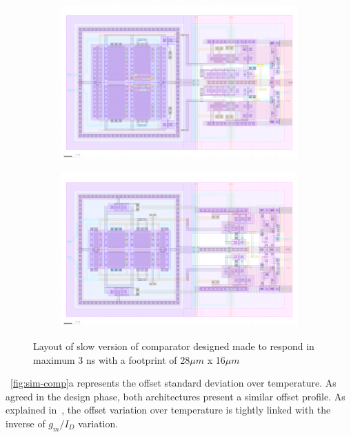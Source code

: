\begin{figure}[!htp]
    \centering
    \begin{subfigure}[b]{0.48\textwidth}
        \includegraphics[width=\textwidth]{Chapter7/Figs/layout-slow-dtl.png}
    \end{subfigure}
    \begin{subfigure}[b]{0.48\textwidth}
        \includegraphics[width=\textwidth]{Chapter7/Figs/layout-slow-sa.png}
    \end{subfigure}
    \caption{Layout of slow version of comparator designed made to respond in maximum 3 ns with a footprint of 28\(\mu m\) x 16\(\mu m\)}
    \label{fig:layout-comp}
\end{figure}

\figurename~\ref{fig:sim-comp}a represents the offset standard deviation over temperature. As agreed in the design phase, both architectures present a similar offset profile. As explained in~\cite{Fonseca2017}, the offset variation over temperature is tightly linked with the inverse of \(g_{m}/I_D\) variation.

